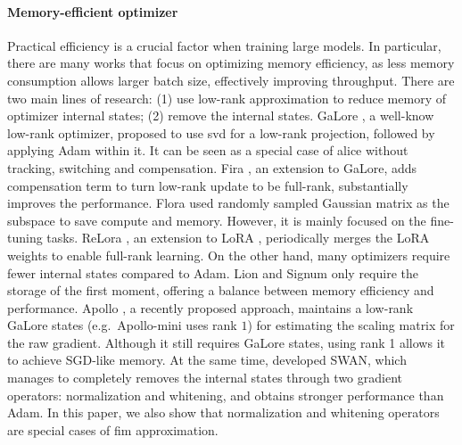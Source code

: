 \paragraph{Memory-efficient optimizer}
Practical efficiency is a crucial factor when training large models. In particular, there are many works that focus on optimizing memory efficiency, as less memory consumption allows larger batch size, effectively improving throughput.
There are two main lines of research: (1) use low-rank approximation to reduce memory of optimizer internal states; (2) remove the internal states.
GaLore \citep{zhao2024galore}, a well-know low-rank optimizer, proposed to use \gls{svd} for a low-rank projection, followed by applying Adam within it. It can be seen as a special case of \gls{alice} without tracking, switching and compensation.
Fira \citep{chen2024fira}, an extension to GaLore, adds compensation term to turn low-rank update to be full-rank, substantially improves the performance. Flora \citep{si2024flora} used randomly sampled Gaussian matrix as the subspace to save compute and memory. However, it is mainly focused on the fine-tuning tasks. ReLora \citep{lialin2023relora}, an extension to LoRA \citep{hu2021lora}, periodically merges the LoRA weights to enable full-rank learning. 
On the other hand, many optimizers require fewer internal states compared to Adam. Lion \citep{chen2024symbolic} and Signum \citep{bernstein2018signsgd} only require the storage of the first moment, offering a balance between memory efficiency and performance. Apollo \citep{zhu2024apollo}, a recently proposed approach, maintains a low-rank GaLore states (e.g.~Apollo-mini uses rank $1$) for estimating the scaling matrix for the raw gradient. Although it still requires GaLore states, using rank 1 allows it to achieve SGD-like memory. At the same time, \citet{ma2024swan} developed SWAN, which manages to completely removes the internal states through two gradient operators: normalization and whitening, and obtains stronger performance than Adam. In this paper, we also show that normalization and whitening operators are special cases of \gls{fim} approximation. 
